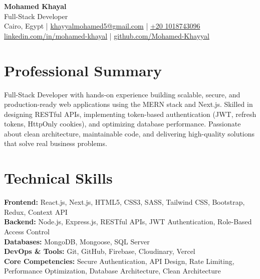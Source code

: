 \documentclass[10pt, letterpaper]{article}
\begin{document}
\begin{center}
    {\Huge \textbf{Mohamed Khayal}} \\[4pt]
    {\Large Full-Stack Developer} \\[6pt]
    \faMapMarker* Cairo, Egypt \quad | \quad
    \faEnvelope[regular] \href{mailto:khayyalmohamed5@gmail.com}{khayyalmohamed5@gmail.com} \quad | \quad
    \faPhone* \href{tel:+201018743096}{+20 1018743096} \\[4pt]
    \faLinkedin \href{https://linkedin.com/in/mohamed-khayal-bb910b378}{linkedin.com/in/mohamed-khayal}
    \quad | \quad
    \faGithub \href{https://github.com/Mohamed-Khayyal}{github.com/Mohamed-Khayyal}
\end{center}
\section{Professional Summary}
Full-Stack Developer with hands-on experience building scalable, secure, and production-ready web applications using the MERN stack and Next.js. Skilled in designing RESTful APIs, implementing token-based authentication (JWT, refresh tokens, HttpOnly cookies), and optimizing database performance. Passionate about clean architecture, maintainable code, and delivering high-quality solutions that solve real business problems.
\section{Technical Skills}
\textbf{Frontend:} React.js, Next.js, HTML5, CSS3, SASS, Tailwind CSS, Bootstrap, Redux, Context API \\
\textbf{Backend:} Node.js, Express.js, RESTful APIs, JWT Authentication, Role-Based Access Control \\
\textbf{Databases:} MongoDB, Mongoose, SQL Server\\
\textbf{DevOps \& Tools:} Git, GitHub, Firebase, Cloudinary, Vercel \\
\textbf{Core Competencies:} Secure Authentication, API Design, Rate Limiting, Performance Optimization, Database Architecture, Clean Architecture
\end{document}

